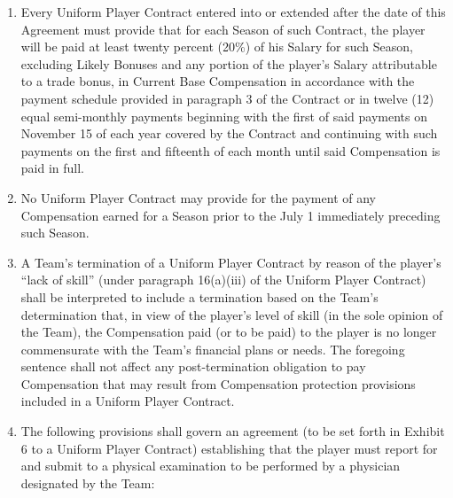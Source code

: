 \documentclass[
]{book}
\begin{document}
\begin{enumerate}
\item
  Every Uniform Player Contract entered into or extended after the date of this Agreement must provide that for each Season of such Contract, the player will be paid at least twenty percent (20\%) of his Salary for such Season, excluding Likely Bonuses and any portion of the player's Salary attributable to a trade bonus, in Current Base Compensation in accordance with the payment schedule provided in paragraph 3 of the Contract or in twelve (12) equal semi-monthly payments beginning with the first of said payments on November 15 of each year covered by the Contract and continuing with such payments on the first and fifteenth of each month until said Compensation is paid in full.
\item
  No Uniform Player Contract may provide for the payment of any Compensation earned for a Season prior to the July 1 immediately preceding such Season.
\item
  A Team's termination of a Uniform Player Contract by reason of the player's ``lack of skill'' (under paragraph 16(a)(iii) of the Uniform Player Contract) shall be interpreted to include a termination based on the Team's determination that, in view of the player's level of skill (in the sole opinion of the Team), the Compensation paid (or to be paid) to the player is no longer commensurate with the Team's financial plans or needs. The foregoing sentence shall not affect any post-termination obligation to pay Compensation that may result from Compensation protection provisions included in a Uniform Player Contract.
\item
  The following provisions shall govern an agreement (to be set forth in Exhibit 6 to a Uniform Player Contract) establishing that the player must report for and submit to a physical examination to be performed by a physician designated by the Team:


\end{enumerate}
\end{document}
